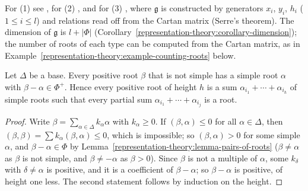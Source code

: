 For (1) see \cite[Section 14.1]{humphreys-lie}, for (2) \cite[Sections 14 and 16]{humphreys-lie}, and for (3) \cite[Section 18]{humphreys-lie}, where $\mathfrak{g}$ is constructed by
generators $x_i$, $y_i$, $h_i$ ($1 \leq i \leq l$) and relations read off from the Cartan matrix (Serre's theorem). The dimension of $\mathfrak{g}$ is $l + |\Phi|$
(Corollary~\ref{representation-theory:corollary-dimension}); the number of roots of each type can be computed from the Cartan matrix, as in
Example~\ref{representation-theory:example-counting-roots} below.


\begin{lemma}\label{representation-theory:lemma-positive-roots-chain}
Let $\Delta$ be a base. Every positive root $\beta$ that is not simple has a simple root $\alpha$ with $\beta - \alpha \in \Phi^+$. Hence every positive root of height $h$ is a sum
$\alpha_{i_1} + \cdots + \alpha_{i_h}$ of simple roots such that every partial sum $\alpha_{i_1} + \cdots + \alpha_{i_j}$ is a root.
\end{lemma}

\begin{proof}
Write $\beta = \sum_{\alpha \in \Delta}k_\alpha\alpha$ with $k_\alpha \geq 0$. If $(\beta, \alpha) \leq 0$ for all $\alpha \in \Delta$, then $(\beta, \beta) = \sum k_\alpha(\beta, \alpha) \leq 0$, which is
impossible; so $(\beta, \alpha) > 0$ for some simple $\alpha$, and $\beta - \alpha \in \Phi$ by Lemma~\ref{representation-theory:lemma-pairs-of-roots} ($\beta \neq \alpha$ as $\beta$ is not
simple, and $\beta \neq -\alpha$ as $\beta > 0$). Since $\beta$ is not a multiple of $\alpha$, some $k_\delta$ with $\delta \neq \alpha$ is positive, and it is a coefficient of $\beta - \alpha$;
so $\beta - \alpha$ is positive, of height one less. The second statement follows by induction on the height.
\end{proof}

